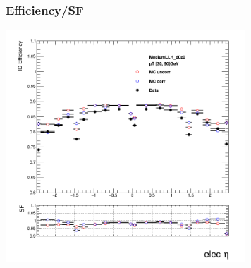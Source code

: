 \documentclass{beamer}
\begin{document}
\begin{frame}
\frametitle{Efficiency/SF}
\centering

\includegraphics[width=9cm]{MCeffm247tom237.png}\\

\end{frame}

\end{document}
